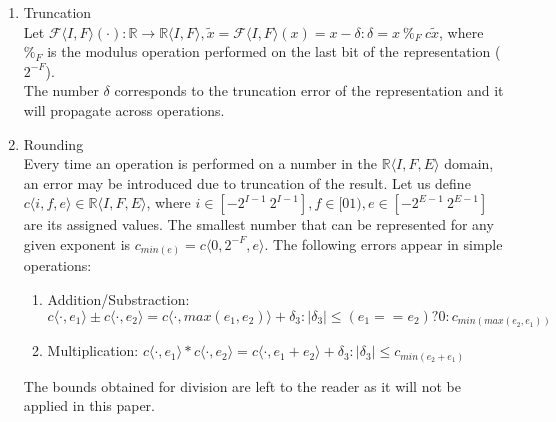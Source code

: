 \documentclass[runningheads,a4paper]{llncs}
\begin{document}
\begin{enumerate}
\item Truncation\\
Let $\mathcal{F}\langle I,F \rangle(\cdot) : \mathbb{R} \rightarrow \mathbb{R}\langle I,F \rangle, \tilde x=\mathcal{F}\langle I,F \rangle(x) = x-\delta : \delta=x\ \%_F\  c\tilde x$, where $\%_F$ is the modulus operation performed on the last bit of the representation ($2^{-F}$).\\
The number $\delta$ corresponds to the truncation error of the representation and it will propagate across operations.
\item Rounding\\
Every time an operation is performed on a number in the $\mathbb{R} \langle I,F,E \rangle$ domain, an error may be
introduced due to truncation of the result.
Let us define $c\langle i,f,e \rangle \in \mathbb{R}\langle I,F,E\rangle$, where $i \in [-2^{I-1}\ 2^{I-1}],f \in [0 1),e \in [-2^{E-1}\ 2^{E-1}]$ are its assigned values. The smallest number that can be represented for any given exponent is $c_{min(e)}=c\langle 0,2^{-F},e\rangle$.
The following errors appear in simple operations:
\begin{enumerate}
\item Addition/Substraction: $c\langle \cdot,e_1\rangle \pm c\langle \cdot,e_2\rangle=c\langle \cdot,max(e_1,e_2)\rangle + \delta_3 : |\delta_3| \leq (e_1==e_2) ? 0 : c_{min(max(e_2,e_1))}$ 
\item Multiplication: $c\langle \cdot,e_1\rangle * c\langle \cdot,e_2\rangle=c\langle \cdot,e_1+e_2\rangle + \delta_3 : |\delta_3| \leq c_{min(e_2+e_1)}$
\end{enumerate}
The bounds obtained for division are left to the reader as it will not be applied in this paper.


\end{enumerate}
\end{document}
